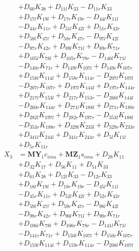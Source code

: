 \begin{multicols}{2}
\begin{align}
&+ D_{60}K_{38} + D_{11l}K_{33} - D_{11r}K_{33}  \nonumber \\
&+ D_{17l}K_{19l} + D_{17r}K_{19r} - D_{44l}K_{11l}  \nonumber \\
&- D_{44r}K_{11r} + D_{51l}K_{42l} + D_{51r}K_{42r}  \nonumber \\
&+ D_{58l}K_{47l} + D_{58r}K_{47r} - D_{97l}K_{42l}  \nonumber \\
&- D_{97r}K_{42r} + D_{89l}K_{71l} + D_{89r}K_{71r}  \nonumber \\
&+ D_{105l}K_{78l} + D_{105r}K_{78r} - D_{140l}K_{71l}  \nonumber \\
&- D_{140r}K_{71r} + D_{149l}K_{107l} + D_{149r}K_{107r}  \nonumber \\
&+ D_{158l}K_{114l} + D_{158r}K_{114r} - D_{207l}K_{107l}  \nonumber \\
&- D_{207r}K_{107r} + D_{197l}K_{144l} + D_{197r}K_{144r}  \nonumber \\
&+ D_{217l}K_{153l} + D_{217r}K_{153r} - D_{260l}K_{144l}  \nonumber \\
&- D_{260r}K_{144r} + D_{271l}K_{188l} + D_{271r}K_{188r}  \nonumber \\
&+ D_{282l}K_{197l} + D_{282r}K_{197r} - D_{353l}K_{188l}  \nonumber \\
&- D_{353r}K_{188r} + D_{329l}K_{233l} + D_{329r}K_{233r}  \nonumber \\
&+ D_{341l}K_{244l} + D_{341r}K_{244r} + D_{5l}K_{11l}  \nonumber \\
&+ D_{5r}K_{11r} \nonumber \\
X_{3} &= \mathbf{MY}_1c_{imu} + \mathbf{MZ}_1s_{imu} + D_{28}K_{11}  \nonumber \\
&+ D_{32}K_{17} + D_{56}K_{11} + D_{51}K_{33}  \nonumber \\
&+ D_{61}K_{38} + D_{12l}K_{33} - D_{12r}K_{33}  \nonumber \\
&+ D_{18l}K_{19l} + D_{18r}K_{19r} - D_{45l}K_{11l}  \nonumber \\
&- D_{45r}K_{11r} + D_{52l}K_{42l} + D_{52r}K_{42r}  \nonumber \\
&+ D_{59l}K_{47l} + D_{59r}K_{47r} - D_{98l}K_{42l}  \nonumber \\
&- D_{98r}K_{42r} + D_{90l}K_{71l} + D_{90r}K_{71r}  \nonumber \\
&+ D_{106l}K_{78l} + D_{106r}K_{78r} - D_{141l}K_{71l}  \nonumber \\
&- D_{141r}K_{71r} + D_{150l}K_{107l} + D_{150r}K_{107r}  \nonumber \\
&+ D_{159l}K_{114l} + D_{159r}K_{114r} - D_{208l}K_{107l}  \nonumber \\

\end{align}
\end{multicols}
